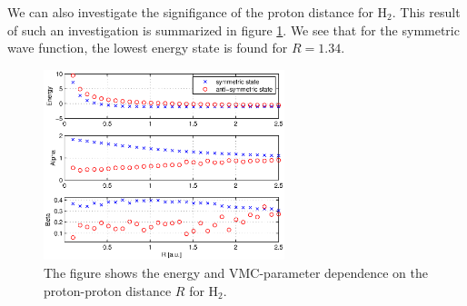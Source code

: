 \documentclass[aps,prc,twocolumn,floatfix]{revtex4}
\begin{document}
We can also investigate the signifigance of the proton distance for $\text{H}_2$. This result of such an investigation is summarized in figure \ref{fig:rvar}. We see that for the symmetric wave function, the lowest energy state is found for $R=1.34$.


 \begin{figure}
\centering
\includegraphics[width=7cm]{figures/Rvar1.eps}
\caption{\label{fig:rvar} The figure shows the energy and VMC-parameter dependence on the proton-proton distance $R$ for $\text{H}_2$.}
\end{figure}

\clearpage
\end{document}
